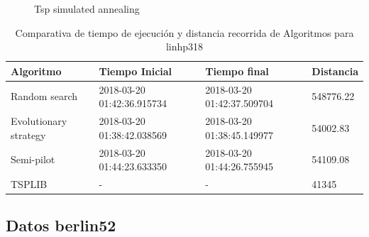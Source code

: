 \documentclass{article}
\begin{document}
\begin{figure}[H]
\begin {minipage}{0.33\textwidth}
	\caption{\label{fig:Figura1} Tsp simulated annealing}
	\end{minipage}
\end{figure}

\begin{table}[H]
\centering
\caption{Comparativa de tiempo de ejecución y distancia recorrida de Algoritmos para linhp318}
\label{Table:linhp318}
\begin{tabular}{| l | l | l | l |}
\hline
Algoritmo & Tiempo Inicial & Tiempo final & Distancia \\ \hline
Random search & 2018-03-20 01:42:36.915734 & 2018-03-20 01:42:37.509704 & 548776.22 \\ \hline
Evolutionary strategy & 2018-03-20 01:38:42.038569 & 2018-03-20 01:38:45.149977 & 54002.83 \\ \hline
Semi-pilot & 2018-03-20 01:44:23.633350 & 2018-03-20 01:44:26.755945 & 54109.08 \\ \hline
TSPLIB & - & - & 41345 \\ \hline

\end{tabular}
\end{table}

\subsection{Datos berlin52}
\end{document}
